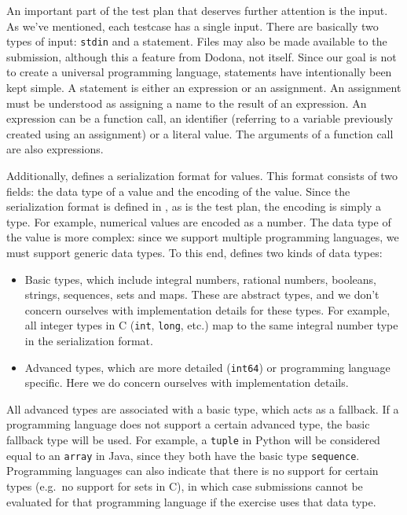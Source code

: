 \documentclass[5p,number]{elsarticle}
\begin{document}
    An important part of the test plan that deserves further attention is the input.
    As we've mentioned, each testcase has a single input.
    There are basically two types of input: \texttt{stdin} and a statement.
    Files may also be made available to the submission, although this a feature from Dodona, not \tested{} itself.
    Since our goal is not to create a universal programming language, statements have intentionally been kept simple.
    A statement is either an expression or an assignment.
    An assignment must be understood as assigning a name to the result of an expression.
    An expression can be a function call, an identifier (referring to a variable previously created using an assignment) or a literal value.
    The arguments of a function call are also expressions.

    Additionally, \tested{} defines a serialization format for values.
    This format consists of two fields: the data type of a value and the encoding of the value.
    Since the serialization format is defined in , as is the test plan, the encoding is simply a  type.
    For example, numerical values are encoded as a  number.
    The data type of the value is more complex: since we support multiple programming languages, we must support generic data types.
    To this end, \tested{} defines two kinds of data types:

    \begin{itemize}
        \item Basic types, which include integral numbers, rational numbers, booleans, strings, sequences, sets and maps.
        These are abstract types, and we don't concern ourselves with implementation details for these types.
        For example, all integer types in C (\texttt{int}, \texttt{long}, etc.) map to the same integral number type in the serialization format.
        \item Advanced types, which are more detailed (\texttt{int64}) or programming language specific.
        Here we do concern ourselves with implementation details.
    \end{itemize}

    All advanced types are associated with a basic type, which acts as a fallback.
    If a programming language does not support a certain advanced type, the basic fallback type will be used.
    For example, a \texttt{tuple} in Python will be considered equal to an \texttt{array} in Java, since they both have the basic type \texttt{sequence}.
    Programming languages can also indicate that there is no support for certain types (e.g.\ no support for sets in C), in which case submissions cannot be evaluated for that programming language if the exercise uses that data type.
    
\end{document}
